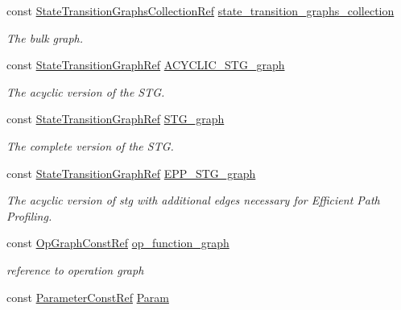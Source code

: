 \begin{DoxyCompactItemize}
\item 
const \hyperlink{state__transition__graph_8hpp_a2613a37dfdde13c61d36bfaba91f433e}{State\+Transition\+Graphs\+Collection\+Ref} \hyperlink{classStateTransitionGraphManager_a439f79c2fa146206de821722e8e900fc}{state\+\_\+transition\+\_\+graphs\+\_\+collection}
\begin{DoxyCompactList}\small\item\em The bulk graph. \end{DoxyCompactList}\item 
const \hyperlink{state__transition__graph_8hpp_a50ba60cd5e113de254d5d7638bbbba86}{State\+Transition\+Graph\+Ref} \hyperlink{classStateTransitionGraphManager_a6476835456b6e6d2e95a0e7f3e54fac1}{A\+C\+Y\+C\+L\+I\+C\+\_\+\+S\+T\+G\+\_\+graph}
\begin{DoxyCompactList}\small\item\em The acyclic version of the S\+TG. \end{DoxyCompactList}\item 
const \hyperlink{state__transition__graph_8hpp_a50ba60cd5e113de254d5d7638bbbba86}{State\+Transition\+Graph\+Ref} \hyperlink{classStateTransitionGraphManager_a1de9563ff14d1cee745af2770b0ab90d}{S\+T\+G\+\_\+graph}
\begin{DoxyCompactList}\small\item\em The complete version of the S\+TG. \end{DoxyCompactList}\item 
const \hyperlink{state__transition__graph_8hpp_a50ba60cd5e113de254d5d7638bbbba86}{State\+Transition\+Graph\+Ref} \hyperlink{classStateTransitionGraphManager_ade0364ea48b923b9ecdac9f9bd955797}{E\+P\+P\+\_\+\+S\+T\+G\+\_\+graph}
\begin{DoxyCompactList}\small\item\em The acyclic version of stg with additional edges necessary for Efficient Path Profiling. \end{DoxyCompactList}\item 
const \hyperlink{op__graph_8hpp_a9a0b240622c47584bee6951a6f5de746}{Op\+Graph\+Const\+Ref} \hyperlink{classStateTransitionGraphManager_a6f78fda06b78f88c2ba0575079ee783a}{op\+\_\+function\+\_\+graph}
\begin{DoxyCompactList}\small\item\em reference to operation graph \end{DoxyCompactList}\item 
const \hyperlink{Parameter_8hpp_a37841774a6fcb479b597fdf8955eb4ea}{Parameter\+Const\+Ref} \hyperlink{classStateTransitionGraphManager_ad88fd6f7ae6e825fca7c8ad9bb508203}{Param}

\end{DoxyCompactItemize}
